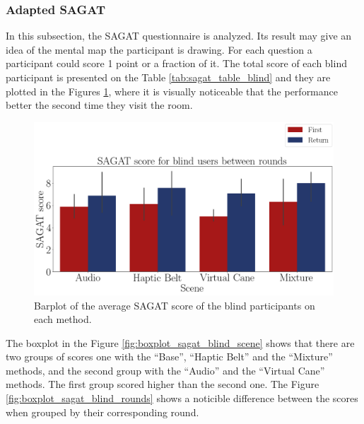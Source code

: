 \subsubsection{Adapted SAGAT}
\label{subsubsec:results_adapted_sagat_1}

In this subsection, the SAGAT questionnaire is analyzed. Its result may give an idea of the mental map the participant is drawing. For each question a participant could score 1 point or a fraction of it. The total score of each blind participant is presented on the Table \ref{tab:sagat_table_blind} and they are plotted in the Figures \ref{fig:barplot_sagat_avg_5_scene_blind}, where it is visually noticeable that the performance better the second time they visit the room. 



\begin{figure}[!htb]
    \centering
    \includegraphics[width = 0.8\linewidth]{Resultados/Sagat/Figuras/png/barplot_sagat_avg_5_scene_blind.png}
    \caption{Barplot of the average SAGAT score of the blind participants on each method.}
    \label{fig:barplot_sagat_avg_5_scene_blind}
\end{figure}

The boxplot in the Figure \ref{fig:boxplot_sagat_blind_scene} shows that there are two groups of scores one with the “Base”, “Haptic Belt” and the “Mixture” methods, and the second group with the “Audio” and the “Virtual Cane” methods. The first group scored higher than the second one. The Figure \ref{fig:boxplot_sagat_blind_rounds} shows a noticible difference between the scores when grouped by their corresponding round.

